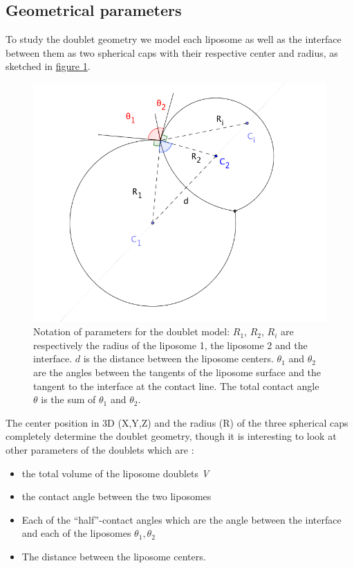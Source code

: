 \documentclass[A4paperpaper,11pt,english]{sphinxmanual}
\begin{document}
\subsection{Geometrical parameters}
\label{parts/part4:geometrical-parameters}
To study the doublet geometry we model each liposome as well as the interface
between them as two spherical caps with their respective center and radius, as
sketched in \hyperref[parts/part4:fig-notations-doublets]{figure  \ref*{parts/part4:fig-notations-doublets}}.
\begin{figure}[htbp]
\centering
\capstart

\includegraphics[width=0.500\linewidth]{notations-doublets.png}
\caption{Notation of parameters for the doublet model: \(R_1\), \(R_2\), \(R_i\) are respectively the
radius of the liposome 1, the liposome 2 and the interface. \(d\) is the
distance between the liposome centers. \(\theta_1\) and \(\theta_2\) are the angles between
the tangents of the liposome surface and the tangent to the interface at the
contact line. The total contact angle \(\theta\) is the sum of \(\theta_1\) and \(\theta_2\).}\label{parts/part4:fig-notations-doublets}\end{figure}

The center position in 3D (X,Y,Z) and the radius (R) of the three spherical caps
completely determine the doublet geometry, though it is interesting to look at other
parameters of the doublets which are :
\begin{itemize}
\item {} 
the total volume of the liposome doublets \emph{V}

\item {} 
the contact angle between the two liposomes

\item {} 
Each of the ``half''-contact angles which are the angle between the
interface and each of the liposomes \(\theta_1,\theta_2\)

\item {} 
The distance between the liposome centers.

\end{itemize}
\end{document}
